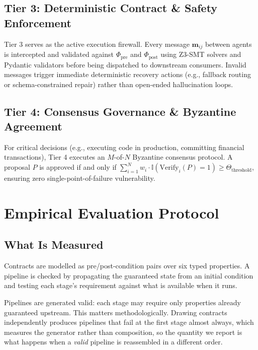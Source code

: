 \documentclass[10pt,journal,compsoc,twocolumn]{IEEEtran}
\begin{document}
\subsection{Tier 3: Deterministic Contract \& Safety Enforcement}

Tier 3 serves as the active execution firewall. Every message $\mathbf{m}_{ij}$ between agents is intercepted and validated against $\Phi_{\text{pre}}$ and $\Phi_{\text{post}}$ using Z3-SMT solvers and Pydantic validators before being dispatched to downstream consumers. Invalid messages trigger immediate deterministic recovery actions (e.g., fallback routing or schema-constrained repair) rather than open-ended hallucination loops.


\subsection{Tier 4: Consensus Governance \& Byzantine Agreement}

For critical decisions (e.g., executing code in production, committing financial transactions), Tier 4 executes an $M$-of-$N$ Byzantine consensus protocol. A proposal $P$ is approved if and only if $\sum_{i=1}^N w_i \cdot \mathbb{I}(\text{Verify}_i(P) = 1) \ge \Theta_{\text{threshold}}$, ensuring zero single-point-of-failure vulnerability.




\section{Empirical Evaluation Protocol}



\subsection{What Is Measured}


Contracts are modelled as pre/post-condition pairs over six typed properties. A pipeline is checked by propagating the guaranteed state from an initial condition and testing each stage's requirement against what is available when it runs.

Pipelines are generated valid: each stage may require only properties already guaranteed upstream. This matters methodologically. Drawing contracts independently produces pipelines that fail at the first stage almost always, which measures the generator rather than composition, so the quantity we report is what happens when a \textit{valid} pipeline is reassembled in a different order.
\end{document}
